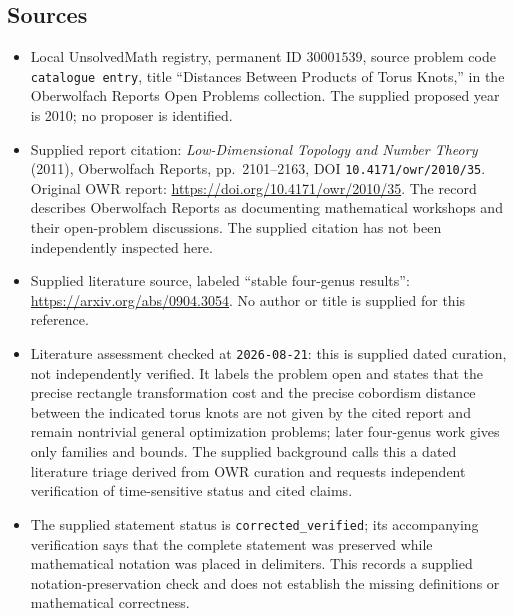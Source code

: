 \documentclass[11pt]{article}
\begin{document}
\subsection{Sources}
\begin{itemize}
\item Local UnsolvedMath registry, permanent ID \(30001539\), source problem code \texttt{catalogue entry}, title ``Distances Between Products of Torus Knots,'' in the Oberwolfach Reports Open Problems collection. The supplied proposed year is 2010; no proposer is identified.
\item Supplied report citation: \emph{Low-Dimensional Topology and Number Theory} (2011), Oberwolfach Reports, pp.~2101--2163, DOI \texttt{10.4171/owr/2010/35}. Original OWR report: \url{https://doi.org/10.4171/owr/2010/35}. The record describes Oberwolfach Reports as documenting mathematical workshops and their open-problem discussions. The supplied citation has not been independently inspected here.
\item Supplied literature source, labeled ``stable four-genus results'': \url{https://arxiv.org/abs/0904.3054}. No author or title is supplied for this reference.
\item Literature assessment checked at \texttt{2026-08-21}: this is supplied dated curation, not independently verified. It labels the problem open and states that the precise rectangle transformation cost and the precise cobordism distance between the indicated torus knots are not given by the cited report and remain nontrivial general optimization problems; later four-genus work gives only families and bounds. The supplied background calls this a dated literature triage derived from OWR curation and requests independent verification of time-sensitive status and cited claims.
\item The supplied statement status is \texttt{corrected\_verified}; its accompanying verification says that the complete statement was preserved while mathematical notation was placed in delimiters. This records a supplied notation-preservation check and does not establish the missing definitions or mathematical correctness.
\end{itemize}
\end{document}
